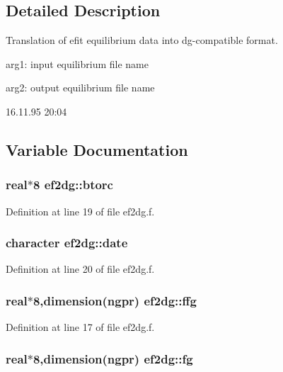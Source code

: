 \subsection{Detailed Description}
Translation of efit equilibrium data into dg-compatible format. 

arg1: input equilibrium file name

arg2: output equilibrium file name

\begin{Desc}
\item[Version:]16.11.95 20:04 \end{Desc}


\subsection{Variable Documentation}
\hypertarget{namespaceef2dg_bde8579d29ca683a349db8d85ee0e0ae}{
\subsubsection[btorc]{\setlength{\rightskip}{0pt plus 5cm}real$\ast$8 {\bf ef2dg::btorc}}}
\label{namespaceef2dg_bde8579d29ca683a349db8d85ee0e0ae}




Definition at line 19 of file ef2dg.f.\hypertarget{namespaceef2dg_06957f7e895cba235575abf88aff14d4}{
\subsubsection[date]{\setlength{\rightskip}{0pt plus 5cm}character {\bf ef2dg::date}}}
\label{namespaceef2dg_06957f7e895cba235575abf88aff14d4}




Definition at line 20 of file ef2dg.f.\hypertarget{namespaceef2dg_9fdb7b146d76ce136d172e5be1672df2}{
\subsubsection[ffg]{\setlength{\rightskip}{0pt plus 5cm}real$\ast$8,dimension(ngpr) {\bf ef2dg::ffg}}}
\label{namespaceef2dg_9fdb7b146d76ce136d172e5be1672df2}




Definition at line 17 of file ef2dg.f.\hypertarget{namespaceef2dg_c2f458f8ca8817889844012157d9c449}{
\subsubsection[fg]{\setlength{\rightskip}{0pt plus 5cm}real$\ast$8,dimension(ngpr) {\bf ef2dg::fg}}}
\label{namespaceef2dg_c2f458f8ca8817889844012157d9c449}




